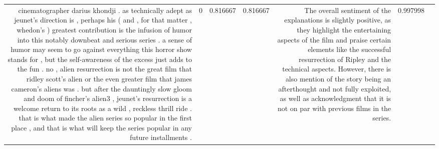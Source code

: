 \begin{tabular}{rlrrrlr}
cinematographer darius khondji .  as technically adept as jeunet's direction is , perhaps his ( and , for that matter , whedon's ) greatest contribution is the infusion of humor into this notably downbeat and serious series .  a sense of humor may seem to go against everything this horror show stands for , but the self-awareness of the excess just adds to the fun .  no , alien resurrection is not the great film that ridley scott's alien or the even greater film that james cameron's aliens was .  but after the dauntingly slow gloom and doom of fincher's alien3 , jeunet's resurrection is a welcome return to its roots as a wild , reckless thrill ride .  that is what made the alien series so popular in the first place , and that is what will keep the series popular in any future installments .   & 0 & 0.816667 & 0.816667 & The overall sentiment of the explanations is slightly positive, as they highlight the entertaining aspects of the film and praise certain elements like the successful resurrection of Ripley and the technical aspects. However, there is also mention of the story being an afterthought and not fully exploited, as well as acknowledgment that it is not on par with previous films in the series. & 0.997998 \\

\end{tabular}
